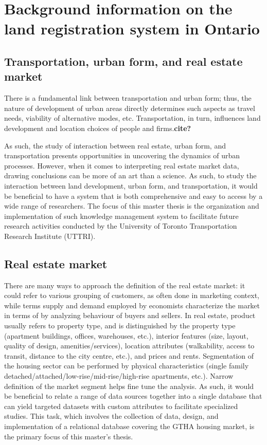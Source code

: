 \chapter[Background]{Background information on the land registration system in Ontario} \label{ch:background}

\section{Transportation, urban form, and real estate market} \label{sec:intro}

There is a fundamental link between transportation and urban form;
thus, the nature of development of urban areas directly determines such aspects as travel needs, viability of alternative modes, etc.
Transportation, in turn, influences land development and location choices of people and firms.\textbf{cite?}

As such, the study of interaction between real estate, urban form, and transportation presents opportunities in uncovering the dynamics of urban processes.
However, when it comes to interpreting real estate market data, drawing conclusions can be more of an art than a science.\cite{Brett2009}
As such, to study the interaction between land development, urban form, and transportation, it would be beneficial to have a system that is both comprehensive and easy to access by a wide range of researchers.
The focus of this master thesis is the organization and implementation of such knowledge management system to facilitate future research activities conducted by the University of Toronto Transportation Research Institute (UTTRI).

\section{Real estate market} \label{sec:real_estate_market}

There are many ways to approach the definition of the real estate market: it could refer to various grouping of customers, as often done in marketing context, while terms supply and demand employed by economists characterize the market in terms of by analyzing behaviour of buyers and sellers.
In real estate, product usually refers to property type, and is distinguished by the property type (apartment buildings, offices, warehouses, etc.), interior features (size, layout, quality of design, amenities/services), location attributes (walkability, access to transit, distance to the city centre, etc.), and prices and rents.
Segmentation of the housing sector can be performed by physical characteristics (single family detached/attached/low-rise/mid-rise/high-rise apartments, etc.).
Narrow definition of the market segment helps fine tune the analysis.\cite{Brett2009}
As such, it would be beneficial to relate a range of data sources together into a single database that can yield targeted datasets with custom attributes to facilitate specialized studies.
This task, which involves the collection of data, design, and implementation of a relational database covering the GTHA housing market, is the primary focus of this master's thesis.

